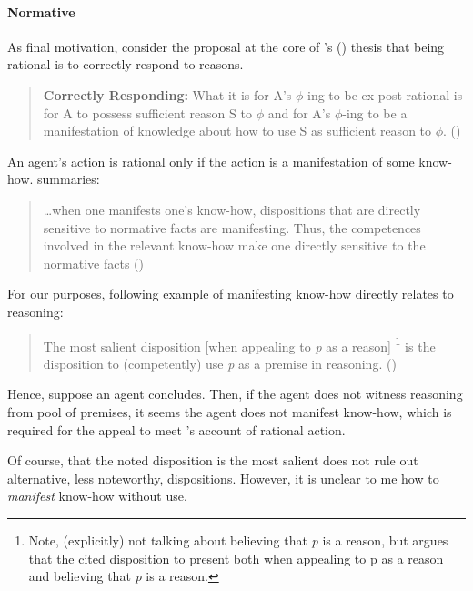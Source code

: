 \paragraph{Normative}

\begin{note}
  As final motivation, consider the proposal at the core of \citeauthor{Lord:2018aa}'s (\citeyear{Lord:2018aa}) thesis that being rational is to correctly respond to reasons.

  \begin{quote}
    \textbf{Correctly Responding:} What it is for A's \(\phi\)-ing to be ex post rational is for A to possess sufficient reason S to \(\phi\) and for A's \(\phi\)-ing to be a manifestation of knowledge about how to use S as sufficient reason to \(\phi\).%
    \mbox{}\hfill\mbox{(\citeyear[143]{Lord:2018aa})}
  \end{quote}

  An agent's action is rational only if the action is a manifestation of some know-how.
  \citeauthor{Lord:2018aa} summaries:

  \begin{quote}
    \dots when one manifests one's know-how, dispositions that are directly sensitive to normative facts are manifesting. Thus, the competences involved in the relevant know-how make one directly sensitive to the normative facts%
    \mbox{}\hfill\mbox{(\citeyear[16]{Lord:2018aa})}
  \end{quote}

  For our purposes, following example of manifesting know-how directly relates to reasoning:

  \begin{quote}
    The most salient disposition [when appealing to \emph{p} as a reason]%
    \footnote{Note, \citeauthor{Lord:2018aa} (explicitly) not talking about believing that \emph{p} is a reason, but argues that the cited disposition to present both when appealing to p as a reason and believing that \emph{p} is a reason.}
    is the disposition to (competently) use \emph{p} as a premise in reasoning.%
    \mbox{}\hfill\mbox{(\citeyear[25]{Lord:2018aa})}
  \end{quote}

  Hence, suppose an agent concludes.
  Then, if the agent does not witness reasoning from pool of premises, it seems the agent does not manifest know-how, which is required for the appeal to meet \citeauthor{Lord:2018aa}'s account of rational action.

  Of course, that the noted disposition is the most salient does not rule out alternative, less noteworthy, dispositions.
  However, it is unclear to me how to \emph{manifest} know-how without use.
\end{note}

